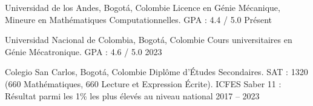 \cvsection{\EducationLabel}

\cvedu
{Universidad de los Andes, Bogotá, Colombie}
{Licence en Génie Mécanique, Mineure en Mathématiques Computationnelles. GPA : 4.4 / 5.0}
{Présent}

\entryspace

\cvedu
{Universidad Nacional de Colombia, Bogotá, Colombie}
{Cours universitaires en Génie Mécatronique. GPA : 4.6 / 5.0}
{2023}

\entryspace

\cvedu
{Colegio San Carlos, Bogotá, Colombie}
{Diplôme d'Études Secondaires. SAT : 1320 (660 Mathématiques, 660 Lecture et Expression Écrite). ICFES Saber 11 : Résultat parmi les 1\% les plus élevés au niveau national}
{2017 -- 2023}